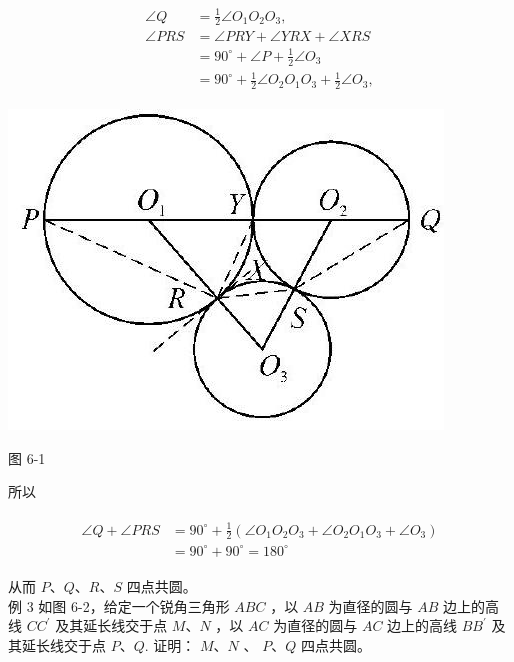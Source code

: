 \documentclass[10pt]{article}
\begin{document}
\begin{align*}
\begin{aligned}
\angle Q & =\frac{1}{2} \angle O_{1} O_{2} O_{3}, \\
\angle P R S & =\angle P R Y+\angle Y R X+\angle X R S \\
& =90^{\circ}+\angle P+\frac{1}{2} \angle O_{3} \\
& =90^{\circ}+\frac{1}{2} \angle O_{2} O_{1} O_{3}+\frac{1}{2} \angle O_{3},
\end{aligned}
\end{align*}

\begin{center}
\includegraphics[max width=\textwidth]{2024_10_30_66b8e5e701da2093c133g-044(1)}
\end{center}

图 6-1

所以

\begin{align*}
\begin{aligned}
\angle Q+\angle P R S & =90^{\circ}+\frac{1}{2}\left(\angle O_{1} O_{2} O_{3}+\angle O_{2} O_{1} O_{3}+\angle O_{3}\right) \\
& =90^{\circ}+90^{\circ}=180^{\circ}
\end{aligned}
\end{align*}

从而 $P 、 Q 、 R 、 S$ 四点共圆。\\
例 3 如图 6-2，给定一个锐角三角形 $A B C$ ，以 $A B$ 为直径的圆与 $A B$ 边上的高线 $C C^{\prime}$ 及其延长线交于点 $M 、 N$ ，以 $A C$ 为直径的圆与 $A C$ 边上的高线 $B B^{\prime}$ 及其延长线交于点 $P 、 Q$. 证明： $M 、 N$ 、 $P 、 Q$ 四点共圆。
\end{document}
